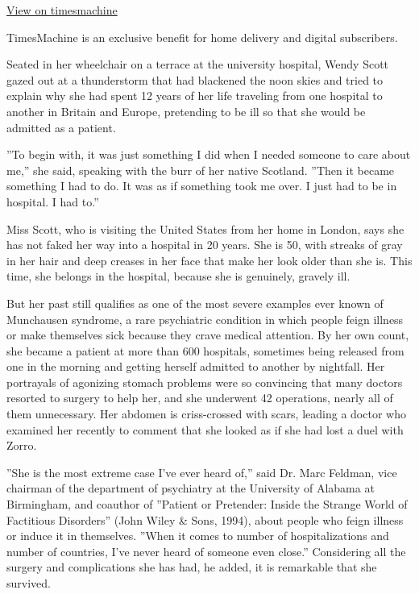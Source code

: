 \href{http://timesmachine.nytimes.com/timesmachine/1999/07/20/677973.html}{View
on timesmachine}

TimesMachine is an exclusive benefit for home delivery and digital
subscribers.

Seated in her wheelchair on a terrace at the university hospital, Wendy
Scott gazed out at a thunderstorm that had blackened the noon skies and
tried to explain why she had spent 12 years of her life traveling from
one hospital to another in Britain and Europe, pretending to be ill so
that she would be admitted as a patient.

''To begin with, it was just something I did when I needed someone to
care about me,'' she said, speaking with the burr of her native
Scotland. ''Then it became something I had to do. It was as if something
took me over. I just had to be in hospital. I had to.''

Miss Scott, who is visiting the United States from her home in London,
says she has not faked her way into a hospital in 20 years. She is 50,
with streaks of gray in her hair and deep creases in her face that make
her look older than she is. This time, she belongs in the hospital,
because she is genuinely, gravely ill.

But her past still qualifies as one of the most severe examples ever
known of Munchausen syndrome, a rare psychiatric condition in which
people feign illness or make themselves sick because they crave medical
attention. By her own count, she became a patient at more than 600
hospitals, sometimes being released from one in the morning and getting
herself admitted to another by nightfall. Her portrayals of agonizing
stomach problems were so convincing that many doctors resorted to
surgery to help her, and she underwent 42 operations, nearly all of them
unnecessary. Her abdomen is criss-crossed with scars, leading a doctor
who examined her recently to comment that she looked as if she had lost
a duel with Zorro.

''She is the most extreme case I've ever heard of,'' said Dr. Marc
Feldman, vice chairman of the department of psychiatry at the University
of Alabama at Birmingham, and coauthor of ''Patient or Pretender: Inside
the Strange World of Factitious Disorders'' (John Wiley \& Sons, 1994),
about people who feign illness or induce it in themselves. ''When it
comes to number of hospitalizations and number of countries, I've never
heard of someone even close.'' Considering all the surgery and
complications she has had, he added, it is remarkable that she survived.

